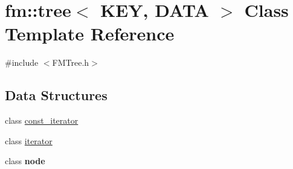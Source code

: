 \hypertarget{classfm_1_1tree}{
\section{fm::tree$<$ KEY, DATA $>$ Class Template Reference}
\label{classfm_1_1tree}
}


{\ttfamily \#include $<$FMTree.h$>$}

\subsection*{Data Structures}
\begin{DoxyCompactItemize}
\item 
class \hyperlink{classfm_1_1tree_1_1const__iterator}{const\_\-iterator}
\item 
class \hyperlink{classfm_1_1tree_1_1iterator}{iterator}
\item 
class {\bfseries node}
\end{DoxyCompactItemize}

